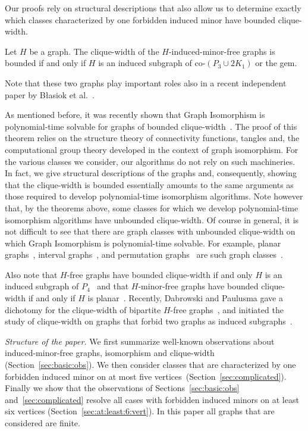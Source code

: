 \documentclass[envcountsame,envcountsect,11pt,a4paper]{llncs}
\begin{document}
Our proofs rely on structural descriptions that also allow us to determine exactly which classes characterized by one forbidden induced
minor have bounded clique-width.

\begin{theorem}
\label{thm:clique-width}
Let $H$ be a graph. The clique-width of the $H$-induced-minor-free graphs is bounded if and only if $H$ is an induced subgraph of
co-$(P_{3} \cup 2 K_{1})$ or the gem.
\end{theorem}
Note that these two graphs play important roles also in a recent independent paper by B{\l}asiok et al.~\cite{BlasiokKRT15}.


As mentioned before, it was recently shown that {\sc Graph Isomorphism} is polynomial-time solvable for graphs of bounded clique-width~\cite{rankwidth}.
The proof of this theorem relies on the structure theory of connectivity functions, tangles
and, the computational group theory developed in the context of graph isomorphism.
For the various classes we consider, our algorithms do not rely on such machineries.  In fact, we give structural descriptions of the graphs
and, consequently, showing that the clique-width is bounded essentially amounts to the same arguments as those required to develop
polynomial-time isomorphism algorithms.
Note however that, by the theorems above, some classes for which we develop polynomial-time isomorphism algorithms have unbounded clique-width. 
Of course in general, it is not difficult to see that there are graph classes with unbounded clique-width on which {\sc Graph Isomorphism}
is polynomial-time solvable.  For example, planar graphs~\cite{DBLP:conf/coco/HopcroftT72}, interval graphs~\cite{LuekerB79},
and permutation graphs~\cite{Colbourn81} are such graph classes~\cite{GolumbicR00}.

Also note that $H$-free graphs have bounded clique-width if and only $H$ is an induced subgraph of $P_4$~\cite{DP16+} and that $H$-minor-free
graphs have bounded clique-width if and only if $H$ is planar~\cite{KaminskiLozinMilanic2009}.  Recently, Dabrowski and Paulusma gave a
dichotomy for the clique-width of bipartite $H$-free graphs~\cite{DP16}, and initiated the study of clique-width on graphs that forbid two
graphs as induced subgraphs~\cite{DP16+}.

{\it Structure of the paper.}
We first summarize well-known observations about induced-minor-free graphs, isomorphism and clique-width (Section~\ref{sec:basic:obs}).
We then consider classes that are characterized by one forbidden induced minor on at most five vertices~(Section~\ref{sec:complicated}). 
Finally we show that the observations of Sections~\ref{sec:basic:obs} and~\ref{sec:complicated} resolve all cases with forbidden induced minors on at least six vertices (Section~\ref{sec:at:least:6:vert}). 
In this paper all graphs that are considered are finite. 
\end{document}
